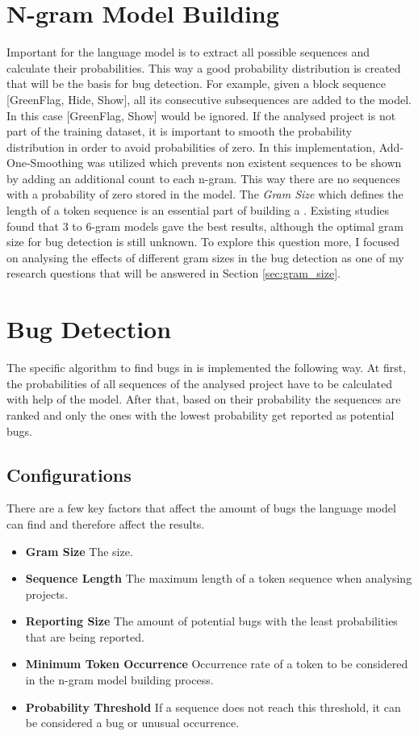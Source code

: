 \section{N-gram Model Building}\label{sec:model}
Important for the language model is to extract all possible sequences and calculate their probabilities. This way a good probability distribution is created that will be the basis for bug detection. For example, given a block sequence [GreenFlag, Hide, Show], all its consecutive subsequences are added to the model. In this case [GreenFlag, Show] would be ignored. If the analysed project is not part of the training dataset, it is important to smooth the probability distribution in order to avoid probabilities of zero. In this implementation, Add-One-Smoothing was utilized which prevents non existent sequences to be shown by adding an additional count to each n-gram. This way there are no sequences with a probability of zero stored in the model. The \textit{Gram Size} which defines the length of a token sequence is an essential part of building a \ngram{}. Existing studies found that 3 to 6-gram models gave the best results, although the optimal gram size for bug detection is still unknown. To explore this question more, I focused on analysing the effects of different gram sizes in the \scratch{} bug detection as one of my research questions that will be answered in Section \ref{sec:gram_size}.

\section{Bug Detection}\label{sec:detection}
The specific algorithm to find bugs in \scratch{} is implemented the following way. At first, the probabilities of all sequences of the analysed project have to be calculated with help of the model. After that, based on their probability the sequences are ranked and only the ones with the lowest probability get reported as potential bugs. 

\subsection{Configurations}\label{subsec:configurations}
There are a few key factors that affect the amount of bugs the language model can find and therefore affect the results.
\begin{itemize}
\item \textbf{Gram Size} The \ngram{} size.
\item \textbf{Sequence Length} The maximum length of a token sequence when analysing \scratch{} projects. 
\item \textbf{Reporting Size} The amount of potential bugs with the least probabilities that are being reported.
\item \textbf{Minimum Token Occurrence} Occurrence rate of a token to be considered in the n-gram model building process.
\item \textbf{Probability Threshold} If a sequence does not reach this threshold, it can be considered a bug or unusual occurrence. 
\end{itemize} 
